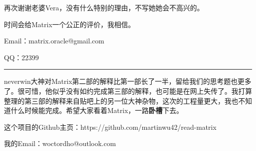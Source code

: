 \documentclass[UTF8]{ctexart}
\newcommand{\myparsep}{\noindent \rule[0.5ex]{\linewidth}{1pt}}
\begin{document}
再次谢谢老婆Vera，没有什么特别的理由，不写她她会不高兴的。

时间会给Matrix一个公正的评价，我相信。

Email：matrix.oracle@gmail.com

QQ：22399


\myparsep

neverwin大神对Matrix第二部的解释比第一部长了一半，留给我们的思考题也更多了。很可惜，他似乎没有如约完成第三部的解释，也可能是在网上失传了。我打算整理的第三部的解释来自贴吧上的另一位大神杂物，这次的工程量更大，我也不知道什么时候能完成。希望大家看着Matrix，一路{\bf 卧槽}下去。

这个项目的Github主页：https://github.com/martinwu42/read-matrix

我的Email：woctordho@outlook.com

\end{document}
